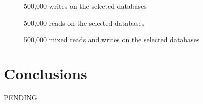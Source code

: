 \documentclass[conference, compsoc]{IEEEtran}
\begin{document}
\begin{figure}
  \caption{500,000 writes on the selected databases}
\end{figure}

\begin{figure}
  \caption{500,000 reads on the selected databases}
\end{figure}

\begin{figure}
  \caption{500,000 mixed reads and writes on the selected databases}
\end{figure}

\section{Conclusions}
PENDING

\newpage


\newpage
\end{document}
